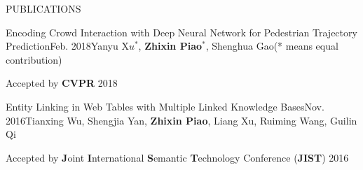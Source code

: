 \documentclass{resume} %
\begin{document}
\begin{rSection}{PUBLICATIONS}
    \begin{pubSubsection}{Encoding Crowd Interaction with Deep Neural Network for Pedestrian Trajectory Prediction}{Feb. 2018}{Yanyu X$u^*$, \textbf{Zhixin Piao}$^*$, Shenghua Gao}{(* means equal contribution)}
        \item Accepted by \textbf{CVPR} 2018
    \end{pubSubsection} 
    \begin{pubSubsection}{Entity Linking in Web Tables with Multiple Linked Knowledge Bases}{Nov. 2016}{Tianxing Wu, Shengjia Yan, \textbf{Zhixin Piao}, Liang Xu, Ruiming Wang, Guilin Qi}{}
        \item Accepted by \textbf{J}oint \textbf{I}nternational \textbf{S}emantic \textbf{T}echnology Conference (\textbf{JIST}) 2016
    \end{pubSubsection} 
\end{rSection} 



\end{document}
